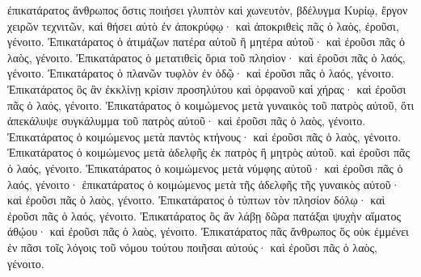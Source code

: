 {ἐπικατάρατος ἄνθρωπος ὅστις ποιήσει γλυπτὸν καὶ χωνευτὸν, βδέλυγμα Κυρίῳ, ἔργον χειρῶν τεχνιτῶν, καὶ θήσει αὐτὸ ἐν ἀποκρύφῳ· καὶ ἀποκριθεὶς πᾶς ὁ λαὸς, ἐροῦσι, γένοιτο.
Ἐπικατάρατος ὁ ἀτιμάζων πατέρα αὐτοῦ ἢ μητέρα αὐτοῦ· καὶ ἐροῦσι πᾶς ὁ λαὸς, γένοιτο.
Ἐπικατάρατος ὁ μετατιθεὶς ὅρια τοῦ πλησὶον· καὶ ἐροῦσι πᾶς ὁ λαός, γένοιτο.
Ἐπικατάρατος ὁ πλανῶν τυφλὸν ἐν ὁδῷ· καὶ ἐροῦσι πᾶς ὁ λαός, γένοιτο.
Ἐπικατάρατος ὃς ἂν ἐκκλίνῃ κρίσιν προσηλύτου καὶ ὀρφανοῦ καὶ χήρας· καὶ ἐροῦσι πᾶς ὁ λαός, γένοιτο.
Ἐπικατάρατος ὁ κοιμώμενος μετὰ γυναικὸς τοῦ πατρὸς αὐτοῦ, ὅτι ἀπεκάλυψε συγκάλυμμα τοῦ πατρὸς αὐτοῦ· καὶ ἐροῦσι πᾶς ὁ λαὸς, γένοιτο.
Ἐπικατάρατος ὁ κοιμώμενος μετὰ παντὸς κτήνους· καὶ ἐροῦσι πᾶς ὁ λαὸς, γένοιτο.
Ἐπικατάρατος ὁ κοιμώμενος μετὰ ἀδελφῆς ἐκ πατρὸς ἢ μητρὸς αὐτοῦ. καὶ ἐροῦσι πᾶς ὁ λαός, γένοιτο.
Ἐπικατάρατος ὁ κοιμώμενος μετὰ νύμφης αὐτοῦ· καὶ ἐροῦσι πᾶς ὁ λαός, γένοιτο· ἐπικατάρατος ὁ κοιμώμενος μετὰ τῆς ἀδελφῆς τῆς γυναικὸς αὐτοῦ· καὶ ἐροῦσι πᾶς ὁ λαὸς, γένοιτο.
Ἐπικατάρατος ὁ τύπτων τὸν πλησίον δόλῳ· καὶ ἐροῦσι πᾶς ὁ λαός, γένοιτο.
Ἐπικατάρατος ὃς ἂν λάβῃ δῶρα πατάξαι ψυχὴν αἵματος ἀθῴου· καὶ ἐροῦσι πᾶς ὁ λαὸς, γένοιτο.
Ἐπικατάρατος πᾶς ἄνθρωπος ὃς οὐκ ἐμμένει ἐν πᾶσι τοῖς λόγοις τοῦ νόμου τούτου ποιῆσαι αὐτούς· καὶ ἐροῦσι πᾶς ὁ λαὸς, γένοιτο.

}
